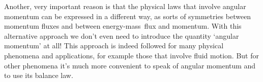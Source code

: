 \documentclass[a4paper,12pt,%
onecolumn,oneside,%
british%
]{memoir}
\renewcommand*{\|}[1][]{\nonscript\:#1\vert\nonscript\:\mathopen{}}
\newcommand*{\energym}{energy-mass}
\begin{document}
Another, very important reason is that the physical laws that involve angular momentum can be expressed in a different way, as sorts of symmetries between momentum fluxes and between \energym\ flux and momentum. With this alternative approach we don't even need to introduce the quantity \enquote*{angular momentum} at all! This approach is indeed followed for many physical phenomena and applications, for example those that involve fluid motion. But for other phenomena it's much more convenient to speak of angular momentum and to use its balance law.
%
\end{document}
